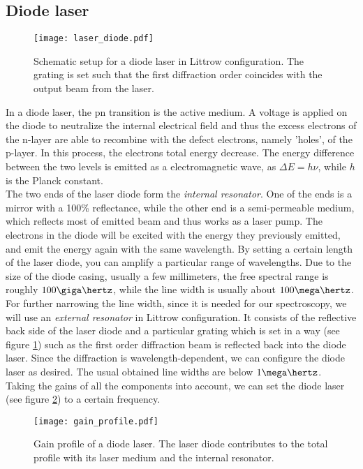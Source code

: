\subsection{Diode laser}
\begin{figure}[h]
	\centering
	\texttt{[image: laser\_diode.pdf]}
	\caption[Schematic setup for a diode laser in Littrow configuration]{Schematic setup for a diode laser in Littrow configuration. The grating is set such that the first diffraction order coincides with the output beam from the laser.}
	\label{fig:laser_diode}
\end{figure}
In a diode laser, the pn transition is the active medium. A voltage is applied on the diode to neutralize the internal electrical field and thus the excess electrons of the n-layer are able to recombine with the defect electrons, namely 'holes', of the p-layer. In this process, the electrons total energy decrease. The energy difference between the two levels is emitted as a electromagnetic wave, as $\Delta E=h\nu$, while $h$ is the Planck constant.\\
The two ends of the laser diode form the \emph{internal resonator}. One of the ends is a mirror with a 100\% reflectance, while the other end is a semi-permeable medium, which reflects most of emitted beam and thus works as a laser pump. The electrons in the diode will be excited with the energy they previously emitted, and emit the energy again with the same wavelength. By setting a certain length of the laser diode, you can amplify a particular range of wavelengths. Due to the size of the diode casing, usually a few millimeters, the free spectral range is roughly $100\giga\hertz$, while the line width is usually about $100\mega\hertz$.\\
For further narrowing the line width, since it is needed for our spectroscopy, we will use an \emph{external resonator} in Littrow configuration. It consists of the reflective back side of the laser diode and a particular grating which is set in a way (see figure \ref{fig:laser_diode}) such as the first order diffraction beam is reflected back into the diode laser. Since the diffraction is wavelength-dependent, we can configure the diode laser as desired. The usual obtained line widths are below $1\mega\hertz$.\\
Taking the gains of all the components into account, we can set the diode laser (see figure \ref{fig:gain_profiles}) to a certain frequency.
\begin{figure}[h]
	\centering
	\texttt{[image: gain\_profile.pdf]}
	\caption[Gain profile of a diode laser]{Gain profile of a diode laser. The laser diode contributes to the total profile with its laser medium and the internal resonator. }
	\label{fig:gain_profiles}
\end{figure}
